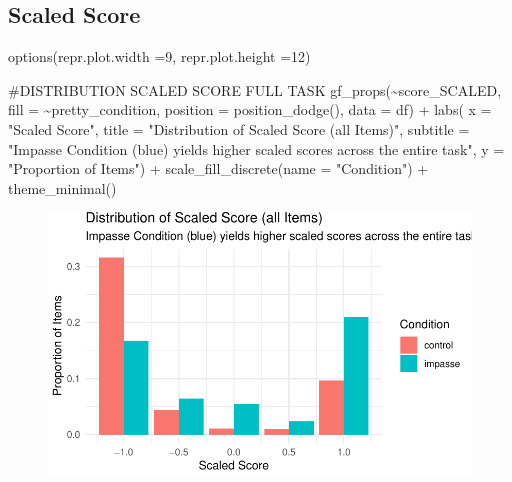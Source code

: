 \documentclass[
  letterpaper,
  DIV=11,
  numbers=noendperiod]{scrreprt}
\newenvironment{Shaded}{\begin{snugshade}}{\end{snugshade}}
\newcommand{\AlertTok}[1]{\textcolor[rgb]{0.68,0.00,0.00}{#1}}
\newcommand{\AttributeTok}[1]{\textcolor[rgb]{0.40,0.45,0.13}{#1}}
\newcommand{\CommentTok}[1]{\textcolor[rgb]{0.37,0.37,0.37}{#1}}
\newcommand{\DecValTok}[1]{\textcolor[rgb]{0.68,0.00,0.00}{#1}}
\newcommand{\FunctionTok}[1]{\textcolor[rgb]{0.28,0.35,0.67}{#1}}
\newcommand{\NormalTok}[1]{\textcolor[rgb]{0.00,0.23,0.31}{#1}}
\newcommand{\SpecialCharTok}[1]{\textcolor[rgb]{0.37,0.37,0.37}{#1}}
\newcommand{\StringTok}[1]{\textcolor[rgb]{0.13,0.47,0.30}{#1}}
\begin{document}
\hypertarget{scaled-score}{%
\subsection{Scaled Score}\label{scaled-score}}

\begin{Shaded}
\begin{Highlighting}[]
\FunctionTok{options}\NormalTok{(}\AttributeTok{repr.plot.width =}\DecValTok{9}\NormalTok{, }\AttributeTok{repr.plot.height =}\DecValTok{12}\NormalTok{)}

\CommentTok{\#DISTRIBUTION SCALED SCORE FULL }\AlertTok{TASK}
\FunctionTok{gf\_props}\NormalTok{(}\SpecialCharTok{\textasciitilde{}}\NormalTok{score\_SCALED, }\AttributeTok{fill =} \SpecialCharTok{\textasciitilde{}}\NormalTok{pretty\_condition, }\AttributeTok{position =} \FunctionTok{position\_dodge}\NormalTok{(), }\AttributeTok{data =}\NormalTok{ df) }\SpecialCharTok{+}
  \FunctionTok{labs}\NormalTok{( }\AttributeTok{x =} \StringTok{"Scaled Score"}\NormalTok{, }
        \AttributeTok{title =} \StringTok{"Distribution of Scaled Score (all Items)"}\NormalTok{,}
        \AttributeTok{subtitle =} \StringTok{"Impasse Condition (blue) yields higher scaled scores across the entire task"}\NormalTok{,}
        \AttributeTok{y =} \StringTok{"Proportion of Items"}\NormalTok{) }\SpecialCharTok{+}
  \FunctionTok{scale\_fill\_discrete}\NormalTok{(}\AttributeTok{name =} \StringTok{"Condition"}\NormalTok{) }\SpecialCharTok{+}  
  \FunctionTok{theme\_minimal}\NormalTok{()}
\end{Highlighting}
\end{Shaded}

\begin{figure}[H]

{\centering \includegraphics{analysis/SGC3A/2_sgc3A_scoring_files/figure-pdf/DISTR-SCALEDSCORE-1.pdf}

}

\end{figure}
\end{document}
